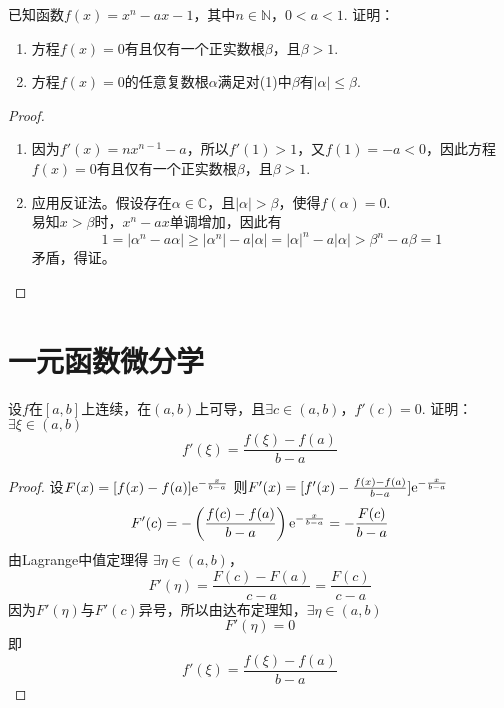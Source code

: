 \begin{proposition}

    已知函数$f(x) = x^n - ax - 1$，其中$n \in \mathbb{N}$，$0 < a < 1$. 证明：

    \begin{enumerate}

        \item 方程$f(x) = 0$有且仅有一个正实数根$\beta$，且$\beta > 1$.
        
        \item 方程$f(x) = 0$的任意复数根$\alpha$满足对(1)中$\beta$有$|\alpha| \leq \beta$.
        
    \end{enumerate}

\end{proposition}

\begin{proof}

    \begin{enumerate}

        \item 因为$f'(x) = nx^{n - 1} - a$，所以$f'(1) > 1$，又$f(1) = -a < 0$，因此方程$f(x) = 0$有且仅有一个正实数根$\beta$，且$\beta > 1$.
        
        \item 
            应用反证法。假设存在$\alpha \in \mathbb{C}$，且$|\alpha| > \beta$，使得$f(\alpha) = 0$. \\
            易知$x > \beta$时，$x^n - ax$单调增加，因此有
            $$1 = |\alpha^n - a\alpha| \geq |\alpha^n| - a|\alpha| = |\alpha|^n - a|\alpha| > \beta^n - a\beta = 1$$
            矛盾，得证。

    \end{enumerate}

\end{proof}

\section{一元函数微分学}

\begin{proposition}
    
    设$f$在$[a, b]$上连续，在$(a, b)$上可导，且$\exists c \in (a, b)$，$f'(c) = 0$.
    证明：$\exists \xi \in (a, b)$
    $$f'(\xi) = \dfrac{f(\xi) - f(a)}{b - a}$$

\end{proposition}

\begin{proof}
    
    设$F(x) = [f(x) - f(a)]\mathrm{e}^{-\frac{x}{b - a}}$
    则$F'(x) = [f'(x) - \frac{f(x) - f(a)}{b - a}]\mathrm{e}^{-\frac{x}{b - a}}$
    $$F'(c) = -\left( \dfrac{f(c) - f(a)}{b - a} \right)\mathrm{e}^{-\frac{x}{b - a}} = -\dfrac{F(c)}{b - a}$$
    由\textup{Lagrange}中值定理得
    $\exists \eta \in (a, b)$，
    $$F'(\eta) = \dfrac{F(c) - F(a)}{c - a} = \dfrac{F(c)}{c - a}$$
    因为$F'(\eta)$与$F'(c)$异号，所以由达布定理知，$\exists \eta \in (a, b)$
    $$F'(\eta) = 0$$
    即
    $$f'(\xi) = \dfrac{f(\xi) - f(a)}{b - a}$$

\end{proof}

